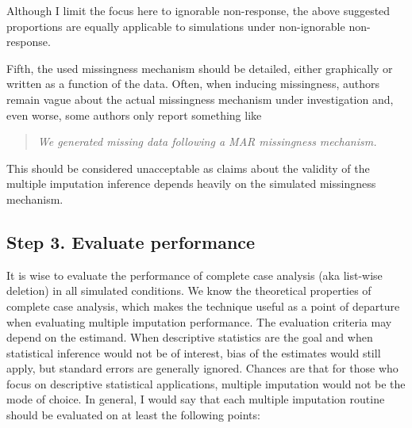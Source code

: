 \documentclass[
]{article}
\begin{document}
Although I limit the focus here to ignorable non-response, the above
suggested proportions are equally applicable to simulations under
non-ignorable non-response.

Fifth, the used missingness mechanism should be detailed, either
graphically or written as a function of the data. Often, when inducing
missingness, authors remain vague about the actual missingness mechanism
under investigation and, even worse, some authors only report something
like

\begin{quote}
\emph{We generated missing data following a MAR missingness mechanism.}
\end{quote}

This should be considered unacceptable as claims about the validity of
the multiple imputation inference depends heavily on the simulated
missingness mechanism.

\hypertarget{step-3.-evaluate-performance}{%
\subsection{Step 3. Evaluate
performance}\label{step-3.-evaluate-performance}}

It is wise to evaluate the performance of complete case analysis (aka
list-wise deletion) in all simulated conditions. We know the theoretical
properties of complete case analysis, which makes the technique useful
as a point of departure when evaluating multiple imputation performance.
The evaluation criteria may depend on the estimand. When descriptive
statistics are the goal and when statistical inference would not be of
interest, bias of the estimates would still apply, but standard errors
are generally ignored. Chances are that for those who focus on
descriptive statistical applications, multiple imputation would not be
the mode of choice. In general, I would say that each multiple
imputation routine should be evaluated on at least the following points:
\end{document}
